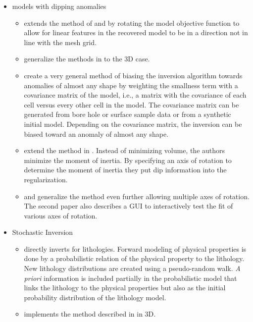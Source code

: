 \begin{itemize}
\begin{itemize}
\end{itemize}
\item models with dipping anomalies
\begin{itemize}
\item \cite{li2000incorporating}  extends the method of \cite{li19963} and \cite{li19983} by rotating the model objective function to allow for linear features in the recovered model to be in a direction not in line with the mesh grid.
\item \cite{lelievre2009comprehensive} generalize the methods in \cite{li2000incorporating} to the 3D case.
\item \cite{chasseriau20033d} create a very general method of biasing the inversion algorithm towards anomalies of almost any shape by weighting the smallness term with a covariance matrix of the model, i.e., a matrix with the covariance of each cell versus every other cell in the model. The covariance matrix can be generated from bore hole or surface sample data or from a synthetic initial model. Depending on the covariance matrix, the inversion can be biased toward an anomaly of almost any shape.
\item \cite{guillen1984gravity} extend the method in \cite{last1983compact}. Instead of minimizing volume, the authors minimize the moment of inertia. By specifying an axis of rotation to determine the moment of inertia they put dip information into the regularization.
\item \cite{barbosa1994generalized} and \cite{barbosa2006interactive} generalize the method even further allowing multiple axes of rotation. The second paper also describes a GUI to interactively test the fit of various axes of rotation.
\end{itemize}
\item Stochastic Inversion
\begin{itemize}
\item \cite{bosch2001lithologic} directly inverts for lithologies. Forward modeling of physical properties is done by a probabilistic relation of the physical property to the lithology. New lithology distributions are created using a pseudo-random walk. \emph{A priori} information is included partially in the probabilistic model that links the lithology to the physical properties but also as the initial probability distribution of the lithology model.
\item \cite{guillen2008geological} implements the method described in \cite{bosch2001lithologic} in 3D.
\end{itemize}

\end{itemize}
